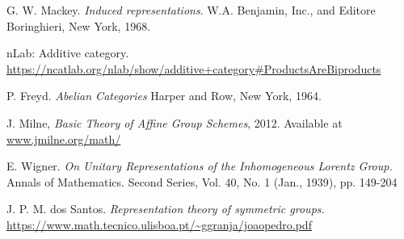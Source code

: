 \documentclass[a4paper,10pt]{scrreprt}
\theoremstyle{definition}
\theoremstyle{plain}
\theoremstyle{remark}
\begin{document}
\begin{thebibliography}{9}
   G. W. Mackey.
    \textit{Induced representations}.
    W.A. Benjamin, Inc., and Editore Boringhieri, New York, 1968.

   nLab: Additive category.
    \url{https://ncatlab.org/nlab/show/additive+category#ProductsAreBiproducts}

   P. Freyd.
    \textit{Abelian Categories}
    Harper and Row, New York, 1964.

   J. Milne,
    \textit{Basic Theory of Affine Group Schemes},
    2012. 
    Available at \url{www.jmilne.org/math/}

   E. Wigner.
    \textit{On Unitary Representations of the Inhomogeneous Lorentz Group.}
    Annals of Mathematics. Second Series, Vol. 40, No. 1 (Jan., 1939), pp. 149-204

   J. P. M. dos Santos.
    \emph{Representation theory of symmetric groups.}
    \url{https://www.math.tecnico.ulisboa.pt/~ggranja/joaopedro.pdf}
\end{thebibliography}
\end{document}
